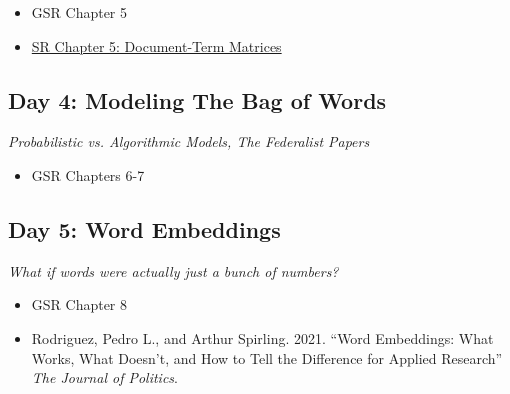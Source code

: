 \documentclass[11pt, letterpaper]{article}
\begin{document}
\begin{itemize}
	\item GSR Chapter 5
	\item \href{https://www.tidytextmining.com/dtm.html}{SR Chapter 5: Document-Term Matrices}
\end{itemize}

\subsection*{Day 4: Modeling The Bag of Words}

\textit{Probabilistic vs. Algorithmic Models, The Federalist Papers}

\begin{itemize}
	\item GSR Chapters 6-7
\end{itemize}

\subsection*{Day 5: Word Embeddings}

\textit{What if words were actually just a bunch of numbers?}

\begin{itemize}
	\item GSR Chapter 8
	\item Rodriguez, Pedro L., and Arthur Spirling. 2021. ``Word Embeddings: What Works, What Doesn’t, and How to Tell the Difference for Applied Research'' \textit{The Journal of Politics}.
\end{itemize}


%
%
\end{document}
